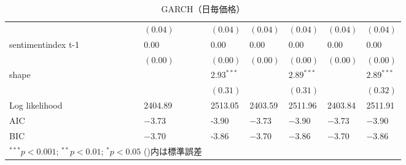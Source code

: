 \begin{landscape}
\begin{table}[]
\begin{tabular}{lllllll}
                   & $(0.04)$     & $(0.04)$     & $(0.04)$     & $(0.04)$     & $(0.04)$     & $(0.04)$     \\
sentimentindex t-1 & 0.00         & 0.00         & 0.00         & 0.00         & 0.00         & 0.00         \\
                   & $(0.00)$     & $(0.00)$     & $(0.00)$     & $(0.00)$     & $(0.00)$     & $(0.00)$     \\
shape              &              & $2.93^{***}$ &              & $2.89^{***}$ &              & $2.89^{***}$ \\
                   &              & $(0.31)$     &              & $(0.31)$     &              & $(0.32)$     \\ \hline
Log likelihood     & 2404.89      & 2513.05      & 2403.59      & 2511.96      & 2403.84      & 2511.91      \\
AIC                & −3.73        & -3.90        & −3.73        & −3.90        & −3.73        & −3.90        \\
BIC                & −3.70        & -3.86        & −3.70        & −3.86        & −3.70        & −3.86        \\ \hline
\multicolumn{2}{l}{\scriptsize{$^{***}p<0.001$; $^{**}p<0.01$; $^{*}p<0.05$ ()内は標準誤差}}
\end{tabular}
\caption{GARCH（日毎価格）}
\end{table}
\end{landscape}




